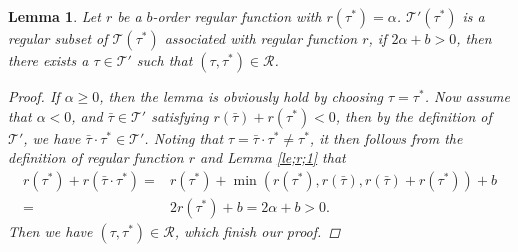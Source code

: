 \documentclass{article}
\newtheorem{lemma}{Lemma}[section]
\numberwithin{equation}{section}
\newcommand{\ml}{\mathcal}
\begin{document}
\begin{lemma}
   Let $r$ be a $b$-order regular function with $r(\tau^*)=\alpha$. $\ml T'(\tau^*)$ is a regular subset of $\ml T(\tau^*)$  associated with regular function $r$, if  $2\alpha+b >0$, then there exists a $\tau\in \ml T'$ such that $(\tau,\tau^*)\in \ml R$. 
    \begin{proof}
     If $\alpha\geq0$, then the lemma is obviously hold by choosing $\tau=\tau^*$. Now assume that $\alpha<0$, and $\bar \tau\in\ml T'$ satisfying $r(\bar \tau)+r(\tau^*)<0$, then by the definition of $\ml T'$, we have $\bar\tau\cdot \tau^*\in\ml T'$. Noting that $\tau=\bar\tau\cdot \tau^*\neq \tau^*$, it then follows from the definition of regular function $r$ and Lemma \ref{le;r;1} that
     \begin{align*}
r(\tau^*)+r(\bar\tau\cdot\tau^*)=&r(\tau^*)+\min(r(\tau^*),r(\bar\tau),r(\bar\tau)+r(\tau^*))+b\\
           =&2r(\tau^*)+b=2\alpha+b>0.
       \end{align*}
    Then we have $(\tau,\tau^*)\in \ml R$, which finish our proof.
       \end{proof}
\end{lemma}
\end{document}
